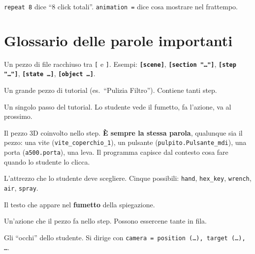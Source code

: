 ﻿\documentclass[a4paper,12pt,oneside]{book}
\newcommand{\kw}[1]{\texttt{\color{keycolor}#1}}
\newcommand{\val}[1]{\texttt{\color{cvtgreen}#1}}
\newcommand{\sez}[1]{\texttt{\color{sectioncolor}\textbf{#1}}}
\begin{document}
\val{repeat 8} dice ``8 click totali''. \kw{animation =} dice cosa mostrare
nel frattempo.

\chapter{Glossario delle parole importanti}
\label{ch:glossario}

\begin{description}[leftmargin=2.5cm,style=nextline]

\item[\textbf{Block} (blocco)]
Un pezzo di file racchiuso tra \texttt{[} e \texttt{]}. Esempi:
\sez{[scene]}, \sez{[section "\ldots"]}, \sez{[step "\ldots"]},
\sez{[state \ldots]}, \sez{[object \ldots]}.

\item[\textbf{Section} (sezione, capitolo)]
Un grande pezzo di tutorial (es.\ ``Pulizia Filtro''). Contiene tanti step.

\item[\textbf{Step} (passo)]
Un singolo passo del tutorial. Lo studente vede il fumetto, fa l'azione,
va al prossimo.

\item[\textbf{Element} (elemento)]
Il pezzo 3D coinvolto nello step. \textbf{È sempre la stessa parola}, qualunque
sia il pezzo: una vite (\texttt{vite\_coperchio\_1}), un pulsante
(\texttt{pulpito.Pulsante\_mdi}), una porta (\texttt{a500.porta}), una leva. Il
programma capisce dal contesto cosa fare quando lo studente lo clicca.

\item[\textbf{Tool} (attrezzo)]
L'attrezzo che lo studente deve scegliere. Cinque possibili: \val{hand},
\val{hex\_key}, \val{wrench}, \val{air}, \val{spray}.

\item[\textbf{Description} (descrizione)]
Il testo che appare nel \textbf{fumetto} della spiegazione.

\item[\textbf{Action / \texttt{do :}}]
Un'azione che il pezzo fa nello step. Possono essercene tante in fila.

\item[\textbf{Camera}]
Gli ``occhi'' dello studente. Si dirige con
\val{camera = position (\ldots), target (\ldots), \ldots}.


\end{description}
\end{document}
